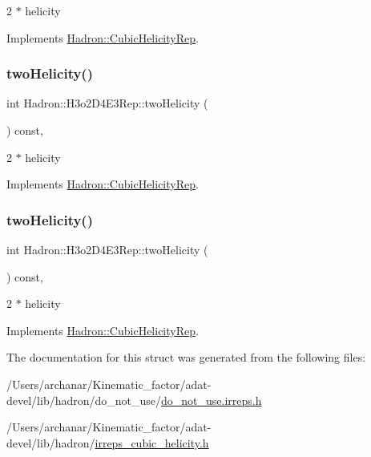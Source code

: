 2 $\ast$ helicity 

Implements \mbox{\hyperlink{structHadron_1_1CubicHelicityRep_af507aa56fc2747eacc8cb6c96db31ecc}{Hadron\+::\+Cubic\+Helicity\+Rep}}.

\mbox{\label{structHadron_1_1H3o2D4E3Rep_a1d69cd4cfd1e5aa720df82ab77e8cc8e}} 
\subsubsection{\texorpdfstring{twoHelicity()}{twoHelicity()}\hspace{0.1cm}{\footnotesize\ttfamily [2/3]}}
{\footnotesize\ttfamily int Hadron\+::\+H3o2\+D4\+E3\+Rep\+::two\+Helicity (\begin{DoxyParamCaption}{ }\end{DoxyParamCaption}) const\hspace{0.3cm}{\ttfamily [inline]}, {\ttfamily [virtual]}}

2 $\ast$ helicity 

Implements \mbox{\hyperlink{structHadron_1_1CubicHelicityRep_af507aa56fc2747eacc8cb6c96db31ecc}{Hadron\+::\+Cubic\+Helicity\+Rep}}.

\mbox{\label{structHadron_1_1H3o2D4E3Rep_a1d69cd4cfd1e5aa720df82ab77e8cc8e}} 
\subsubsection{\texorpdfstring{twoHelicity()}{twoHelicity()}\hspace{0.1cm}{\footnotesize\ttfamily [3/3]}}
{\footnotesize\ttfamily int Hadron\+::\+H3o2\+D4\+E3\+Rep\+::two\+Helicity (\begin{DoxyParamCaption}{ }\end{DoxyParamCaption}) const\hspace{0.3cm}{\ttfamily [inline]}, {\ttfamily [virtual]}}

2 $\ast$ helicity 

Implements \mbox{\hyperlink{structHadron_1_1CubicHelicityRep_af507aa56fc2747eacc8cb6c96db31ecc}{Hadron\+::\+Cubic\+Helicity\+Rep}}.



The documentation for this struct was generated from the following files\+:\begin{DoxyCompactItemize}
\item 
/\+Users/archanar/\+Kinematic\+\_\+factor/adat-\/devel/lib/hadron/do\+\_\+not\+\_\+use/\mbox{\hyperlink{adat-devel_2lib_2hadron_2do__not__use_2do__not__use_8irreps_8h}{do\+\_\+not\+\_\+use.\+irreps.\+h}}\item 
/\+Users/archanar/\+Kinematic\+\_\+factor/adat-\/devel/lib/hadron/\mbox{\hyperlink{adat-devel_2lib_2hadron_2irreps__cubic__helicity_8h}{irreps\+\_\+cubic\+\_\+helicity.\+h}}\end{DoxyCompactItemize}
